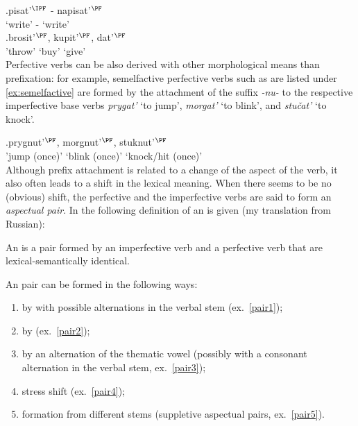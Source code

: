 \exg.\label{ex:asppair}pisat'$^{\IPF}$ - napisat'$^{\PF}$\\
`write' - `write'\\

\exg.\label{ex:unprefperf}brosit'$^{\PF}$, kupit'$^{\PF}$, dat'$^{\PF}$\\
'throw' `buy' `give'\\

Perfective verbs can be also derived with other morphological means than prefixation: for example, semelfactive perfective verbs  such as are listed under \ref{ex:semelfactive} are formed by the attachment of the suffix \textit{-nu-} to the respective imperfective base verbs \textit{prygat'} `to jump', \textit{morgat'} `to blink', and \textit{stu\v{c}at'} `to knock'.

\exg.\label{ex:semelfactive}prygnut'$^{\PF}$, morgnut'$^{\PF}$, stuknut'$^{\PF}$\\
{'jump (once)'} {`blink (once)'} {`knock/hit (once)'}\\

Although prefix attachment is related to a change of the aspect of the verb, it also often leads to a shift in the lexical meaning. When there seems to be no (obvious) shift, the perfective and the imperfective verbs are said to form an \textit{aspectual pair}. In \cite{Rosenthal:76} the following definition of an  is given (my translation from Russian):
\begin{definition}\label{def:pair}
An  is a pair formed by an imperfective verb and a perfective verb that are lexical-semantically identical.
\end{definition}
\noindent An   pair can be formed in the following ways:

\begin{enumerate}[noitemsep]
\item by  with possible alternations in the verbal stem (ex.~\ref{pair1});
\item by  (ex.~\ref{pair2});
\item by an alternation of the thematic vowel (possibly with a consonant alternation in the verbal stem, ex.~\ref{pair3});
\item stress shift (ex.~\ref{pair4});
\item formation from different stems (suppletive aspectual pairs, ex.~\ref{pair5}).
\end{enumerate}

